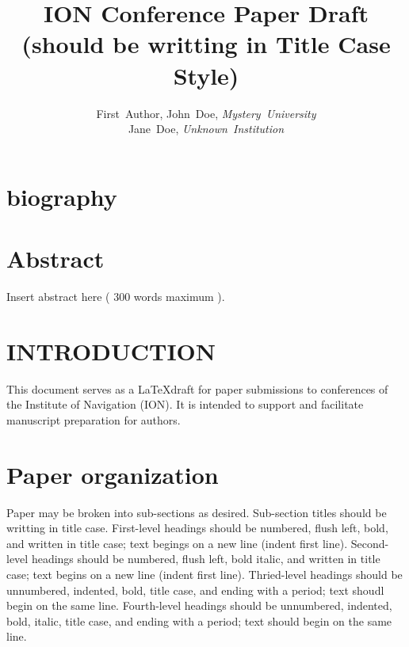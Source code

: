 \documentclass[letterpaper,times]{IONconf}
\title{ION Conference Paper Draft (should be writting in Title Case Style)}
\author{
    First~Author, John~Doe, \textit{Mystery~University}%
    \vspace{1mm} \\%
    Jane~Doe, \textit{Unknown~Institution}%
    }
\begin{document}
\maketitle

\section*{biography}






\section*{Abstract}

Insert abstract here ( 300 words maximum ).


\section{INTRODUCTION}

This document serves as a \LaTeX  draft for paper submissions to conferences of the Institute of Navigation (ION). It is intended to support and facilitate manuscript preparation for authors.


\section{Paper organization}

Paper may be broken into sub-sections as desired. Sub-section titles should be writting in title case. First-level headings should be numbered, flush left, bold, and written in title case; text begings on a new line (indent first line). Second-level headings should be numbered, flush left, bold italic, and written in title case; text begins on a new line (indent first line). Thried-level headings should be unnumbered, indented, bold, title case, and ending with a period; text shoudl begin on the same line. Fourth-level headings should be unnumbered, indented, bold, italic, title case, and ending with a period; text should begin on the same line.
\end{document}
